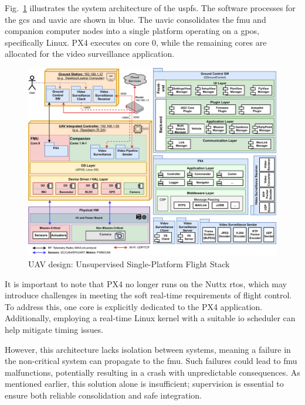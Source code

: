 Fig.~\ref{fig:uav-design-unsup} illustrates the system architecture of the
\gls{uspfs}. The software processes for the \gls{gcs} and \gls{uavic} are shown
in blue. The \gls{uavic} consolidates the \gls{fmu} and companion computer nodes
into a single platform operating on a \gls{gpos}, specifically Linux. PX4
executes on core 0, while the remaining cores are allocated for the video
surveillance application.

\begin{figure}[!hbt]
  \centering
  \includegraphics[width=1.0\textwidth]{./img/pdf/uav-main-design-unsup.pdf} 
%   
  \caption{UAV design: Unsupervised Single-Platform Flight Stack}%
  \label{fig:uav-design-unsup}
\end{figure}

It is important to note that PX4 no longer runs on the Nuttx \gls{rtos}, which may introduce challenges in meeting the soft real-time requirements of flight control. To address this, one core is explicitly dedicated to the PX4 application. Additionally, employing a real-time Linux kernel with a suitable \gls{io} scheduler can help mitigate timing issues.

However, this architecture lacks isolation between systems, meaning a failure in the non-critical system can propagate to the \gls{fmu}. Such failures could lead to \gls{fmu} malfunctions, potentially resulting in a crash with unpredictable consequences. As mentioned earlier, this solution alone is insufficient; supervision is essential to ensure both reliable consolidation and safe integration.

